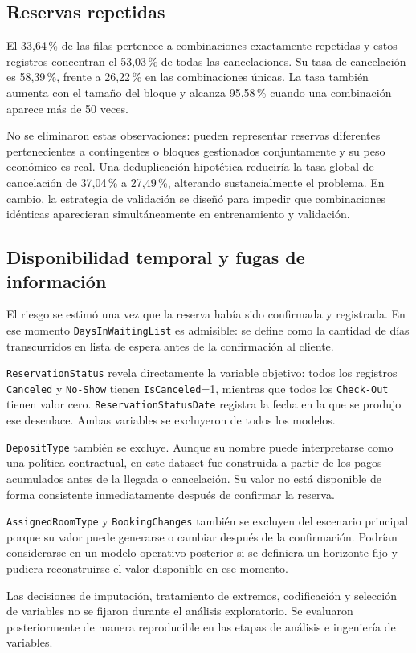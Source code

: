 \subsection{Reservas repetidas}

El 33,64\,\% de las filas pertenece a combinaciones exactamente repetidas y
estos registros concentran el 53,03\,\% de todas las cancelaciones. Su tasa de
cancelación es 58,39\,\%, frente a 26,22\,\% en las combinaciones únicas. La
tasa también aumenta con el tamaño del bloque y alcanza 95,58\,\% cuando una
combinación aparece más de 50 veces.

No se eliminaron estas observaciones: pueden representar reservas diferentes
pertenecientes a contingentes o bloques gestionados conjuntamente y su peso
económico es real. Una deduplicación hipotética reduciría la tasa global de
cancelación de 37,04\,\% a 27,49\,\%, alterando sustancialmente el problema.
En cambio, la estrategia de validación se diseñó para impedir que combinaciones
idénticas aparecieran simultáneamente en entrenamiento y validación.

\subsection{Disponibilidad temporal y fugas de información}

El riesgo se estimó una vez que la reserva había sido confirmada y registrada.
En ese momento \texttt{DaysInWaitingList} es
admisible: se define como la cantidad de días transcurridos en lista de espera
antes de la confirmación al cliente.

\texttt{ReservationStatus} revela directamente la variable objetivo: todos
los registros \texttt{Canceled} y \texttt{No-Show} tienen
\texttt{IsCanceled}=1, mientras que todos los \texttt{Check-Out} tienen valor
cero. \texttt{ReservationStatusDate} registra la fecha en la que se produjo
ese desenlace. Ambas variables se excluyeron de todos los modelos.

\texttt{DepositType} también se excluye. Aunque su nombre puede interpretarse
como una política contractual, en este dataset fue construida a partir de los
pagos acumulados antes de la llegada o cancelación. Su valor no está disponible
de forma consistente inmediatamente después de confirmar la reserva.

\texttt{AssignedRoomType} y \texttt{BookingChanges} también se excluyen del
escenario principal porque su valor puede generarse o cambiar después de la
confirmación. Podrían considerarse en un modelo operativo posterior si se
definiera un horizonte fijo y pudiera reconstruirse el valor disponible en
ese momento.

Las decisiones de imputación, tratamiento de extremos, codificación y
selección de variables no se fijaron durante el análisis exploratorio. Se
evaluaron posteriormente de manera reproducible en las etapas de análisis e
ingeniería de variables.
